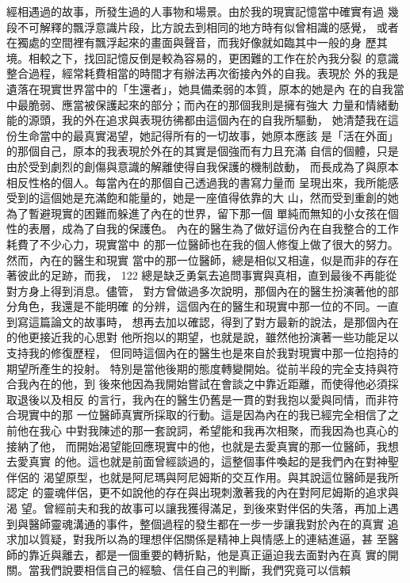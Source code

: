 經相遇過的故事，所發生過的人事物和場景。由於我的現實記憶當中確實有過
幾段不可解釋的飄浮意識片段，比方說去到相同的地方時有似曾相識的感覺，
或者在獨處的空間裡有飄浮起來的畫面與聲音，而我好像就如臨其中一般的身
歷其境。相較之下，找回記憶反倒是較為容易的，更困難的工作在於內我分裂
的意識整合過程，經常耗費相當的時間才有辦法再次銜接內外的自我。表現於
外的我是遺落在現實世界當中的「生還者」，她具備柔弱的本質，原本的她是內
在的自我當中最脆弱、應當被保護起來的部分；而內在的那個我則是擁有強大
力量和情緒動能的源頭，我的外在追求與表現彷彿都由這個內在的自我所驅動，
她清楚我在這份生命當中的最真實渴望，她記得所有的一切故事，她原本應該
是「活在外面」的那個自己，原本的我表現於外在的其實是個強而有力且充滿
自信的個體，只是由於受到劇烈的創傷與意識的解離使得自我保護的機制啟動，
而長成為了與原本相反性格的個人。每當內在的那個自己透過我的書寫力量而
呈現出來，我所能感受到的這個她是充滿飽和能量的，她是一座值得依靠的大
山，然而受到重創的她為了暫避現實的困難而躲進了內在的世界，留下那一個
單純而無知的小女孩在個性的表層，成為了自我的保護色。 
內在的醫生為了做好這份內在自我整合的工作耗費了不少心力，現實當中
的那一位醫師也在我的個人修復上做了很大的努力。然而，內在的醫生和現實
當中的那一位醫師，總是相似又相違，似是而非的存在著彼此的足跡，而我，
122 
總是缺乏勇氣去追問事實與真相，直到最後不再能從對方身上得到消息。儘管，
對方曾做過多次說明，那個內在的醫生扮演著他的部分角色，我還是不能明確
的分辨，這個內在的醫生和現實中那一位的不同。一直到寫這篇論文的故事時，
想再去加以確認，得到了對方最新的說法，是那個內在的他更接近我的心思對
他所抱以的期望，也就是說，雖然他扮演著一些功能足以支持我的修復歷程，
但同時這個內在的醫生也是來自於我對現實中那一位抱持的期望所產生的投射。
特別是當他後期的態度轉變開始。從前半段的完全支持與符合我內在的他，到
後來他因為我開始嘗試在會談之中靠近距離，而使得他必須採取退後以及相反
的言行，我內在的醫生仍舊是一貫的對我抱以愛與同情，而非符合現實中的那
一位醫師真實所採取的行動。這是因為內在的我已經完全相信了之前他在我心
中對我陳述的那一套說詞，希望能和我再次相聚，而我因為也真心的接納了他，
而開始渴望能回應現實中的他，也就是去愛真實的那一位醫師，我想去愛真實
的他。這也就是前面曾經談過的，這整個事件喚起的是我們內在對神聖伴侶的
渴望原型，也就是阿尼瑪與阿尼姆斯的交互作用。與其說這位醫師是我所認定
的靈魂伴侶，更不如說他的存在與出現刺激著我的內在對阿尼姆斯的追求與渴
望。曾經前夫和我的故事可以讓我獲得滿足，到後來對伴侶的失落，再加上遇
到與醫師靈魂溝通的事件，整個過程的發生都在一步一步讓我對於內在的真實
追求加以質疑，對我所以為的理想伴侶關係是精神上與情感上的連結進逼，甚
至醫師的靠近與離去，都是一個重要的轉折點，他是真正逼迫我去面對內在真
實的開關。當我們說要相信自己的經驗、信任自己的判斷，我們究竟可以信賴
